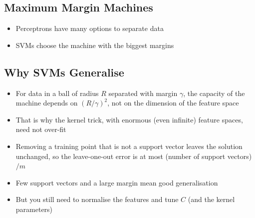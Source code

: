 
\begin{slide}
  \section[-2]{Maximum Margin Machines}
  \pb
  \begin{itemize}
  \item Perceptrons have many options to separate data\pauseh
    \begin{center}
      \pause
    \end{center}
  \item SVMs choose the machine with the biggest margins\pause
  \end{itemize}
\end{slide}


\begin{slide}
\section[-1]{Why SVMs Generalise}

\begin{PauseHighLight}
  \begin{itemize}
  \item For data in a ball of radius $R$ separated with margin
    $\gamma$, the capacity of the machine depends on $(R/\gamma)^2$,
    not on the dimension of the feature space\pause
  \item That is why the kernel trick, with enormous (even infinite)
    feature spaces, need not over-fit\pause
  \item Removing a training point that is not a support vector leaves
    the solution unchanged, so the leave-one-out error is at most
    (number of support vectors)$/m$\pause
  \item Few support vectors and a large margin mean good
    generalisation\pause
  \item But you still need to normalise the features and tune $C$
    (and the kernel parameters)\pause
  \end{itemize}
\end{PauseHighLight}

\end{slide}



